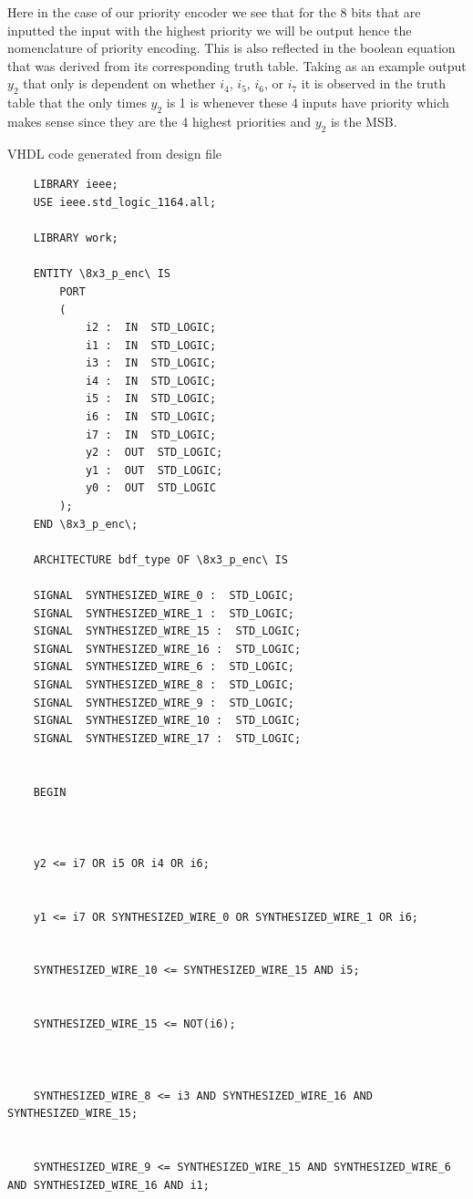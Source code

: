 \documentclass[12pt]{article}
\begin{document}
\noindent Here in the case of our priority encoder we see that for the 8 bits that are inputted the input with the highest priority we will be output hence the nomenclature of priority encoding. This is also reflected in the boolean equation that was derived from its corresponding truth table. Taking as an example output $y_2$ that only is dependent on whether $i_4$, $i_5$, $i_6$, or $i_7$ it is observed in the truth table that the only times $y_2$ is 1 is whenever these 4 inputs have priority which makes sense since they are the 4 highest priorities and $y_2$ is the MSB.



{VHDL code generated from design file}
\begin{verbatim}
    LIBRARY ieee;
    USE ieee.std_logic_1164.all; 
    
    LIBRARY work;
    
    ENTITY \8x3_p_enc\ IS 
    	PORT
    	(
    		i2 :  IN  STD_LOGIC;
    		i1 :  IN  STD_LOGIC;
    		i3 :  IN  STD_LOGIC;
    		i4 :  IN  STD_LOGIC;
    		i5 :  IN  STD_LOGIC;
    		i6 :  IN  STD_LOGIC;
    		i7 :  IN  STD_LOGIC;
    		y2 :  OUT  STD_LOGIC;
    		y1 :  OUT  STD_LOGIC;
    		y0 :  OUT  STD_LOGIC
    	);
    END \8x3_p_enc\;
    
    ARCHITECTURE bdf_type OF \8x3_p_enc\ IS 
    
    SIGNAL	SYNTHESIZED_WIRE_0 :  STD_LOGIC;
    SIGNAL	SYNTHESIZED_WIRE_1 :  STD_LOGIC;
    SIGNAL	SYNTHESIZED_WIRE_15 :  STD_LOGIC;
    SIGNAL	SYNTHESIZED_WIRE_16 :  STD_LOGIC;
    SIGNAL	SYNTHESIZED_WIRE_6 :  STD_LOGIC;
    SIGNAL	SYNTHESIZED_WIRE_8 :  STD_LOGIC;
    SIGNAL	SYNTHESIZED_WIRE_9 :  STD_LOGIC;
    SIGNAL	SYNTHESIZED_WIRE_10 :  STD_LOGIC;
    SIGNAL	SYNTHESIZED_WIRE_17 :  STD_LOGIC;
    
    
    BEGIN 
    
    
    
    y2 <= i7 OR i5 OR i4 OR i6;
    
    
    y1 <= i7 OR SYNTHESIZED_WIRE_0 OR SYNTHESIZED_WIRE_1 OR i6;
    
    
    SYNTHESIZED_WIRE_10 <= SYNTHESIZED_WIRE_15 AND i5;
    
    
    SYNTHESIZED_WIRE_15 <= NOT(i6);
    
    
    
    SYNTHESIZED_WIRE_8 <= i3 AND SYNTHESIZED_WIRE_16 AND SYNTHESIZED_WIRE_15;
    
    
    SYNTHESIZED_WIRE_9 <= SYNTHESIZED_WIRE_15 AND SYNTHESIZED_WIRE_6 AND SYNTHESIZED_WIRE_16 AND i1;
    

\end{verbatim}
\end{document}
